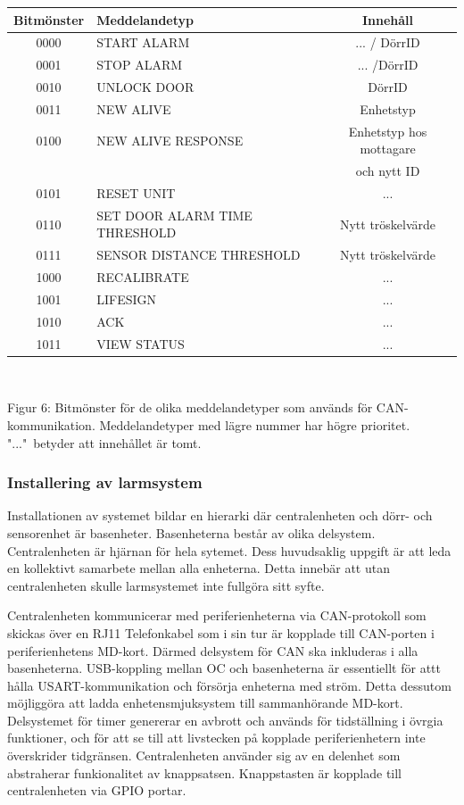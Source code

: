 \documentclass{article}
\begin{document}
\begin{tabular}{|c|l|c|}
    \hline
    Bitmönster & Meddelandetyp & Innehåll \\
    \hline
    0000 & START ALARM & ... / DörrID \\
    0001 & STOP ALARM & ... /DörrID \\
    0010 & UNLOCK DOOR & DörrID \\
    0011 & NEW ALIVE & Enhetstyp \\
    0100 & NEW ALIVE RESPONSE & Enhetstyp hos mottagare \\ 
    &&och nytt ID \\
    0101 & RESET UNIT & ... \\
    0110 & SET DOOR ALARM TIME THRESHOLD & Nytt tröskelvärde \\
    0111 & SENSOR DISTANCE THRESHOLD & Nytt tröskelvärde \\
    1000 & RECALIBRATE & ... \\
    1001 & LIFESIGN & ... \\
    1010 & ACK & ... \\
    1011 & VIEW STATUS & ... \\
    \hline
\end{tabular}
\\
\begin{center}
\caption{Figur 6: Bitmönster för de olika meddelandetyper som används för CAN-kommunikation. Meddelandetyper med lägre nummer har högre prioritet. "..."\ betyder att innehållet är tomt.}
\end{center}

\subsubsection{Installering av larmsystem}
Installationen av systemet bildar en hierarki där centralenheten och dörr- och sensorenhet är basenheter. Basenheterna består av olika delsystem. Centralenheten är hjärnan för hela sytemet. Dess huvudsaklig uppgift är att leda en kollektivt samarbete mellan alla enheterna. Detta innebär att utan centralenheten skulle larmsystemet inte fullgöra sitt syfte. 

\noindent Centralenheten kommunicerar med periferienheterna via CAN-protokoll som skickas över en RJ11 Telefonkabel som i sin tur är kopplade till CAN-porten i periferienhetens MD-kort. Därmed delsystem för CAN ska inkluderas i alla basenheterna. USB-koppling mellan OC och basenheterna är essentiellt för attt hålla USART-kommunikation och försörja enheterna med ström. Detta dessutom möjliggöra att ladda enhetensmjuksystem till sammanhörande MD-kort. Delsystemet för timer genererar en avbrott och används för tidställning i övrgia funktioner, och för att se till att livstecken på kopplade periferienhetern inte överskrider tidgränsen. Centralenheten använder sig av en delenhet som abstraherar funkionalitet av knappsatsen. Knappstasten är kopplade till centralenheten via GPIO portar.
\end{document}
